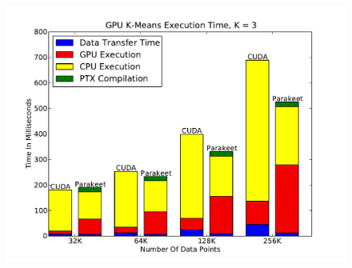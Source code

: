 \documentclass[10pt,twocolumn]{article}
\begin{document}
\begin{figure}[h!]
\includegraphics[scale=0.45]{KMGPU.pdf}
\label{BSGPU}
\end{figure}
\end{document}
